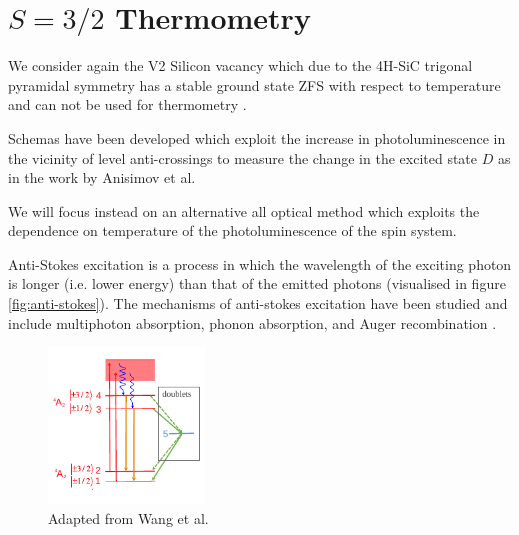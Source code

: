 \section{$S= 3/2$ Thermometry}\label{spin1.5-thermo}

We consider again the V2 Silicon vacancy which due to the 4H-SiC trigonal
pyramidal symmetry has a stable ground state ZFS with respect to temperature and can not be used for thermometry \cite{Castelletto_2024}.

Schemas have been developed which exploit the increase in photoluminescence in the vicinity of level anti-crossings to measure the change in the excited state $D$ as in the work by Anisimov et al.

We will focus instead on an alternative all optical method which exploits the dependence on temperature of the photoluminescence of the spin system.

Anti-Stokes excitation is a process in which the wavelength of the exciting photon is longer (i.e. lower energy) than that
of the emitted photons (visualised in figure \ref{fig:anti-stokes}).  The mechanisms of anti-stokes excitation have been studied and include multiphoton absorption, phonon absorption, and Auger recombination
\cite{Tran2019, Wang2019}.

\begin{figure}%
	\centering%
	\includegraphics[width=0.37\textwidth]{figures/actual-stokes.pdf}
	\caption{Adapted from Wang et al.}\label{fig:stokes}
\end{figure}%




